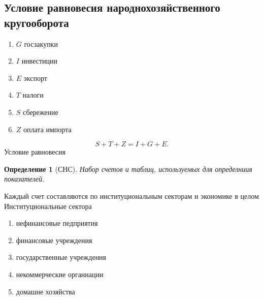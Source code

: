\documentclass[14pt]{extarticle}
\newtheorem{definition}{Определение}
\begin{document}
\subsection{Условие равновесия народнохозяйственного кругооборота}
\begin{enumerate}
    \item $G$ госзакупки
    \item  $I$ инвестиции
    \item  $E$ экспорт
    \item  $T$ налоги
    \item $S$ сбережение
    \item $Z$ оплата импорта
\end{enumerate}
\[
S + T +Z = I + G + E
.\] 
Условие равновесия
\begin{definition}[СНС]
    Набор счетов и таблиц, используемых для определниия показателей.
\end{definition}
Каждый счет составляются по институциональным секторам и экономике в целом \\
Институциональные сектора 
\begin{enumerate}
    \item нефинансовые педприятия
    \item финансовые учреждения
    \item государственные учреждения
    \item некоммерческие органиации
    \item домашне хозяйства
\end{enumerate}
\end{document}
